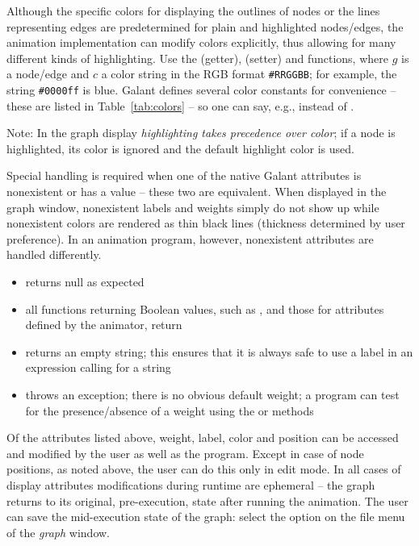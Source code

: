 Although the specific colors for displaying the outlines of nodes
or the lines representing edges are
predetermined for plain
and highlighted nodes/edges,
the animation implementation can modify colors explicitly,
thus allowing for many different kinds of highlighting.
Use the  (getter),  (setter)
and  functions, where $g$ is a
node/edge and $c$ a color string
in the RGB format \texttt{\#RRGGBB}; for example,
the string \texttt{\#0000ff} is blue.
Galant defines several color constants for convenience -- 
these are listed in Table~\ref{tab:colors} -- so one can say, e.g.,
 instead of .

Note: In the graph display \emph{highlighting takes precedence over color};
if a node is highlighted, its color is ignored and the default highlight
color is used.

Special handling is required when one of the native Galant attributes
is nonexistent or has a
 value -- these two are equivalent.
When displayed in the graph window, nonexistent labels and weights simply do
not show up while nonexistent colors are rendered as thin black lines
(thickness determined by user preference).
In an animation program, however, nonexistent attributes are handled
differently.
\begin{itemize}
\item {} returns null as expected
\item all functions returning Boolean values, such as ,
   and those for attributes defined by the animator, return
\item {} returns an empty string; this ensures that it is always
  safe to use a label in an expression calling for a string
\item {} throws an exception; there is no obvious default
  weight; a program can test for the presence/absence of a weight using the
   or  methods
\end{itemize}

Of the attributes listed above, weight, label, color and position can be
accessed and modified by the user as well as the program.
Except in case of node positions, as noted above,
the user can do this only in edit mode.
In all cases of display attributes
modifications during runtime are ephemeral
-- the graph returns to its original, pre-execution, state after running the
animation.
The user can save the mid-execution state of the graph:
select the  option on the file menu of the
\emph{graph} window.

